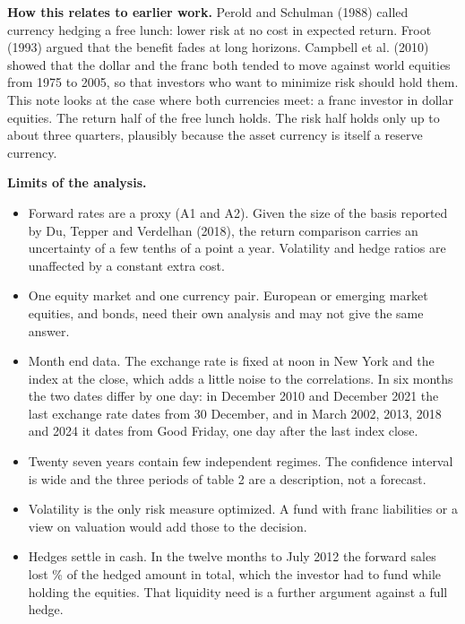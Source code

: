 \documentclass[a4paper,fontsize=10.2pt,parskip=half-]{scrartcl}
\newcommand{\lead}[1]{\textbf{#1}}
\begin{document}
\lead{How this relates to earlier work.} Perold and Schulman (1988) called currency hedging a free lunch: lower risk at no cost in expected return. Froot (1993) argued that the benefit fades at long horizons. Campbell et al. (2010) showed that the dollar and the franc both tended to move against world equities from 1975 to 2005, so that investors who want to minimize risk should hold them. This note looks at the case where both currencies meet: a franc investor in dollar equities. The return half of the free lunch holds. The risk half holds only up to about three quarters, plausibly because the asset currency is itself a reserve currency.

\pagebreak
\lead{Limits of the analysis.}
\begin{itemize}
\item Forward rates are a proxy (A1 and A2). Given the size of the basis reported by Du, Tepper and Verdelhan (2018), the return comparison carries an uncertainty of a few tenths of a point a year. Volatility and hedge ratios are unaffected by a constant extra cost.
\item One equity market and one currency pair. European or emerging market equities, and bonds, need their own analysis and may not give the same answer.
\item Month end data. The exchange rate is fixed at noon in New York and the index at the close, which adds a little noise to the correlations. In six months the two dates differ by one day: in December 2010 and December 2021 the last exchange rate dates from 30 December, and in March 2002, 2013, 2018 and 2024 it dates from Good Friday, one day after the last index close.
\item Twenty seven years contain few independent regimes. The confidence interval is wide and the three periods of table 2 are a description, not a forecast.
\item Volatility is the only risk measure optimized. A fund with franc liabilities or a view on valuation would add those to the decision.
\item Hedges settle in cash. In the twelve months to July 2012 the forward sales lost \CashCall\% of the hedged amount in total, which the investor had to fund while holding the equities. That liquidity need is a further argument against a full hedge.
\end{itemize}
\end{document}
